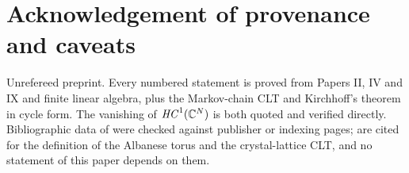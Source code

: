 \section*{Acknowledgement of provenance and caveats}

Unrefereed preprint. Every numbered statement is proved from Papers II, IV and IX and
finite linear algebra, plus the Markov-chain CLT and Kirchhoff's theorem in cycle form.
The vanishing of $\mathit{HC}^{1}(\mathbb{C}^{N})$ is both quoted \cite{Lo} and verified directly.
Bibliographic data of \cite{KS1,KS2,JLO,CC,Lo,Co} were checked against publisher or
indexing pages; \cite{KS1,KS2} are cited for the definition of the Albanese torus and the
crystal-lattice CLT, and no statement of this paper depends on them.
